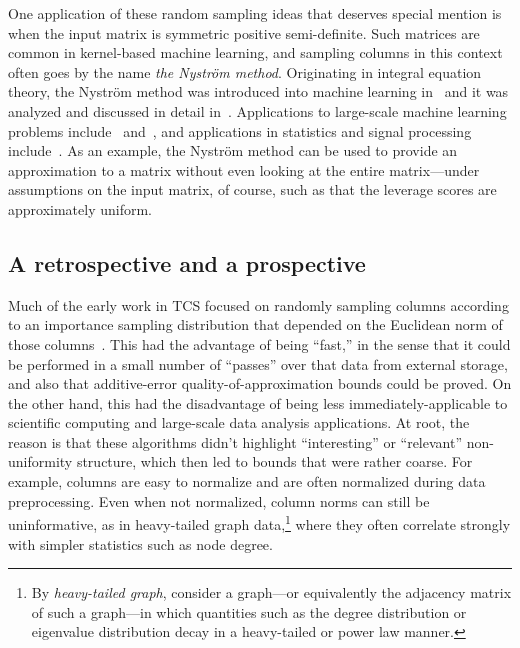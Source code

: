 \documentclass[twoside]{article}
\begin{document}
One application of these random sampling ideas that deserves special mention 
is when the input matrix  is symmetric positive semi-definite. 
Such matrices are common in kernel-based machine learning, and sampling 
columns in this context often goes by the name \emph{the Nystr\"{o}m 
method}.
Originating in integral equation theory, the Nystr\"{o}m method was 
introduced into machine learning in~\cite{WS01} and it was analyzed and
discussed in detail in~\cite{dm_kernel_JRNL}.
Applications to large-scale machine learning problems 
include~\cite{TKR08,KMT09,KMT09c} and~\cite{ZTK08,LKL10,ZK10}, and
applications in statistics and signal processing 
include~\cite{PWT05,BW07_WKSHP,BW07_TR,SW08,BW08,BW09_PNAS,BW09_JRNL}.
As an example, the Nystr\"{o}m method can be used to provide an 
approximation to a matrix without even looking at the entire matrix---under 
assumptions on the input matrix, of course, such as that the leverage scores 
are approximately uniform.

\subsection{A retrospective and a prospective}

Much of the early work in TCS focused on randomly sampling columns according 
to an importance sampling distribution that depended on the Euclidean norm 
of those 
columns~\cite{FKV04,DFKVV04_JRNL,dkm_matrix1,dkm_matrix2,dkm_matrix3,RV07}.
This had the advantage of being ``fast,'' in the sense that it could be
performed in a small number of ``passes'' over that data from external 
storage, and also that additive-error quality-of-approximation bounds could 
be proved.
On the other hand, this had the disadvantage of being less 
immediately-applicable to scientific computing and large-scale data analysis 
applications.
At root, the reason is that these algorithms didn't highlight ``interesting'' or 
``relevant'' non-uniformity structure, which then led to bounds that were 
rather coarse.
For example, columns are easy to normalize and are 
often normalized during data preprocessing.
Even when not normalized, column norms can still be uninformative, as in 
heavy-tailed graph data,\footnote{By \emph{heavy-tailed graph}, consider a graph---or equivalently 
the adjacency matrix of such a graph---in which quantities such as the 
degree distribution or eigenvalue distribution decay in a heavy-tailed or 
power law manner.}
where they often correlate strongly with simpler statistics such as node 
degree.
\end{document}

